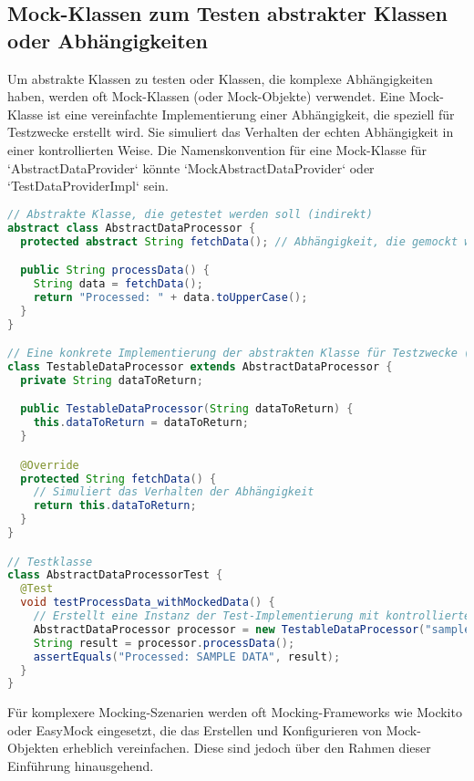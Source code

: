 \subsection{Mock-Klassen zum Testen abstrakter Klassen oder Abhängigkeiten}
\label{ssec:junit_mock_klassen}
Um abstrakte Klassen zu testen oder Klassen, die komplexe Abhängigkeiten haben, werden oft Mock-Klassen (oder Mock-Objekte) verwendet. Eine Mock-Klasse ist eine vereinfachte Implementierung einer Abhängigkeit, die speziell für Testzwecke erstellt wird. Sie simuliert das Verhalten der echten Abhängigkeit in einer kontrollierten Weise.
Die Namenskonvention für eine Mock-Klasse für `AbstractDataProvider` könnte `MockAbstractDataProvider` oder `TestDataProviderImpl` sein.

\begin{lstlisting}[language=Java, caption={Konzept einer Mock-Klasse (vereinfacht)}]
// Abstrakte Klasse, die getestet werden soll (indirekt)
abstract class AbstractDataProcessor {
  protected abstract String fetchData(); // Abhängigkeit, die gemockt werden könnte

  public String processData() {
    String data = fetchData();
    return "Processed: " + data.toUpperCase();
  }
}

// Eine konkrete Implementierung der abstrakten Klasse für Testzwecke (eine Art Mock)
class TestableDataProcessor extends AbstractDataProcessor {
  private String dataToReturn;

  public TestableDataProcessor(String dataToReturn) {
    this.dataToReturn = dataToReturn;
  }

  @Override
  protected String fetchData() {
    // Simuliert das Verhalten der Abhängigkeit
    return this.dataToReturn;
  }
}

// Testklasse
class AbstractDataProcessorTest {
  @Test
  void testProcessData_withMockedData() {
    // Erstellt eine Instanz der Test-Implementierung mit kontrollierten Daten
    AbstractDataProcessor processor = new TestableDataProcessor("sample data");
    String result = processor.processData();
    assertEquals("Processed: SAMPLE DATA", result);
  }
}
\end{lstlisting}
Für komplexere Mocking-Szenarien werden oft Mocking-Frameworks wie Mockito oder EasyMock eingesetzt, die das Erstellen und Konfigurieren von Mock-Objekten erheblich vereinfachen. Diese sind jedoch über den Rahmen dieser Einführung hinausgehend.

